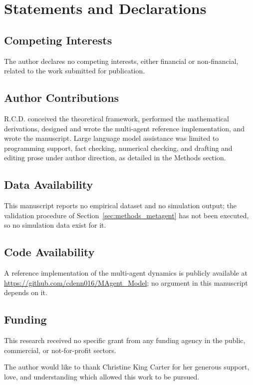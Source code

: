 \section{Statements and Declarations}\label{sec:statements}

\subsection*{Competing Interests}
The author declares no competing interests, either financial or non-financial, related to the work submitted for publication.

\subsection*{Author Contributions}
R.C.D. conceived the theoretical framework, performed the mathematical derivations, designed and wrote the multi-agent reference implementation, and wrote the manuscript. Large language model assistance was limited to programming support, fact checking, numerical checking, and drafting and editing prose under author direction, as detailed in the Methods section.

\subsection*{Data Availability}
This manuscript reports no empirical dataset and no simulation output; the validation procedure of Section~\ref{sec:methods_metagent} has not been executed, so no simulation data exist for it.

\subsection*{Code Availability}
A reference implementation of the multi-agent dynamics is publicly available at \url{https://github.com/cdenn016/MAgent_Model}; no argument in this manuscript depends on it.

\subsection*{Funding}
This research received no specific grant from any funding agency in the public, commercial, or not-for-profit sectors.

\begin{acknowledgments}
The author would like to thank Christine King Carter for her generous support, love, and understanding which allowed this work to be pursued.
\end{acknowledgments}

